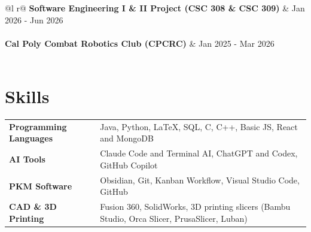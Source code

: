 \documentclass[a4paper,12pt]{article}
\begin{document}
\begin{tabularx}{\linewidth}{ @{}l r@{} }
\textbf{Software Engineering I \& II Project (CSC 308 \& CSC 309)} & \hfill Jan 2026 - Jun 2026 \\[3.75pt]
   \\

\textbf{Cal Poly Combat Robotics Club (CPCRC)} & \hfill Jan 2025 - Mar 2026 \\[3.75pt]
   \\
\end{tabularx}

\section{Skills}
\begin{tabularx}{\linewidth}{@{}l X@{}}
\textbf{Programming Languages} &  \normalsize{Java, Python, \LaTeX, SQL, C, C++, Basic JS, React and MongoDB}\\
\textbf{AI Tools} & \normalsize{Claude Code and Terminal AI, ChatGPT and Codex, GitHub Copilot}\\
\textbf{PKM Software}  &  \normalsize{Obsidian, Git, Kanban Workflow, Visual Studio Code, GitHub}\\  
\textbf{CAD \& 3D Printing} & \normalsize{Fusion 360, SolidWorks, 3D printing slicers (Bambu Studio, Orca Slicer, PrusaSlicer, Luban)}
\end{tabularx}

\vfill
{}
\end{document}

